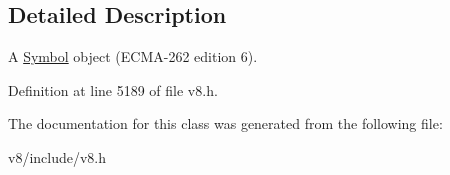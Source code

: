 \subsection{Detailed Description}
A \mbox{\hyperlink{classv8_1_1Symbol}{Symbol}} object (E\+C\+M\+A-\/262 edition 6). 

Definition at line 5189 of file v8.\+h.



The documentation for this class was generated from the following file\+:\begin{DoxyCompactItemize}
\item 
v8/include/v8.\+h\end{DoxyCompactItemize}

